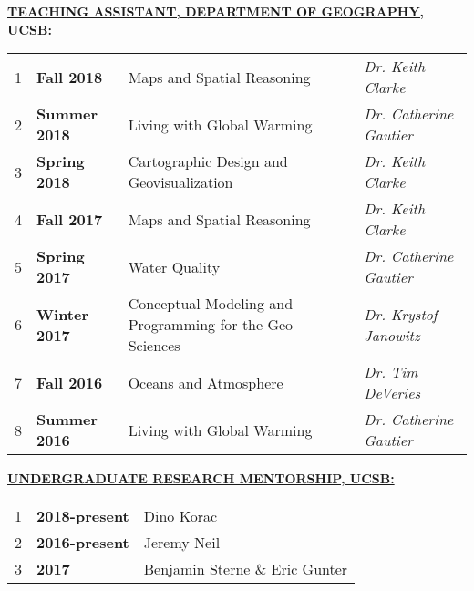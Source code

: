 \documentclass{article}
\newcommand{\header}[1]{\hspace{-5mm}\textcolor{header_blue}{\underline{\textbf{#1}}\\}} %
\begin{document}
\header{TEACHING ASSISTANT, DEPARTMENT OF GEOGRAPHY, UCSB:}
\newline
\vspace{5mm}
\begin{tabular}{lp{2.5cm}p{8.0cm}l}
  1 & \textbf{Fall 2018 } & Maps and Spatial Reasoning & \textit{Dr. Keith Clarke } \\ 
  2 & \textbf{Summer 2018 } & Living with Global Warming & \textit{Dr. Catherine Gautier } \\ 
  3 & \textbf{Spring 2018 } & Cartographic Design and Geovisualization & \textit{Dr. Keith Clarke } \\ 
  4 & \textbf{Fall 2017 } & Maps and Spatial Reasoning & \textit{Dr. Keith Clarke } \\ 
  5 & \textbf{Spring 2017 } & Water Quality & \textit{Dr. Catherine Gautier } \\ 
  6 & \textbf{Winter 2017 } & Conceptual Modeling and Programming for the Geo-Sciences & \textit{Dr. Krystof Janowitz } \\ 
  7 & \textbf{Fall 2016 } & Oceans and Atmosphere & \textit{Dr. Tim DeVeries } \\ 
  8 & \textbf{Summer 2016 } & Living with Global Warming & \textit{Dr. Catherine Gautier } \\ 
  \end{tabular}

\header{UNDERGRADUATE RESEARCH MENTORSHIP, UCSB:}
\newline
\vspace{5mm}
\begin{tabular}{lp{2.5cm}p{8.0cm}}
  1 & \textbf{2018-present } & Dino Korac \\ 
  2 & \textbf{2016-present } & Jeremy Neil \\ 
  3 & \textbf{2017 } & Benjamin Sterne \& Eric Gunter \\ 
  \end{tabular}
\end{document}
